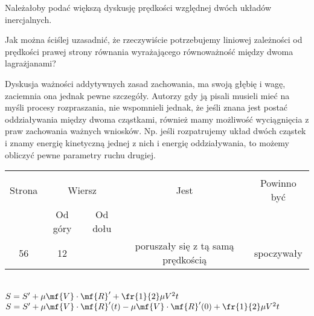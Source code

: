 \documentclass[a4paper,11pt]{article}
\begin{document}
\vspace{\spaceFour}


\start {} Należałoby podać większą dyskusję prędkości względnej
dwóch układów inercjalnych.

\vspace{\spaceFour}


\start {} Jak można ściślej uzasadnić, że rzeczywiście
potrzebujemy liniowej zależności od prędkości prawej strony równania
wyrażającego równoważność między dwoma lagrażjanami? \Dok

\vspace{\spaceFour}


\start {} Dyskusja ważności addytywnych zasad zachowania, ma
swoją głębię i wagę, zaciemnia ona jednak pewne szczegóły. Autorzy gdy
ją pisali musieli mieć na myśli procesy rozpraszania, nie wspomnieli
jednak, że jeśli znana jest postać oddziaływania między dwoma
cząstkami, również mamy możliwość wyciągnięcia z praw zachowania
ważnych wniosków. Np. jeśli rozpatrujemy układ dwóch cząstek i znamy
energię kinetyczną jednej z nich i energię oddziaływania, to możemy
obliczyć pewne parametry ruchu drugiej.


\begin{center}
  \begin{tabular}{|c|c|c|c|c|}
    \hline
    & \multicolumn{2}{c|}{} & & \\
    Strona & \multicolumn{2}{c|}{Wiersz} & Jest
                              & Powinno być \\ \cline{2-3}
    & Od góry & Od dołu & & \\
    \hline
    56  & 12 & & poruszały się z tą samą prędkością & spoczywały \\
    \hline
  \end{tabular}
\end{center}
\noi
{} \\
\Jest $S = S' + \mu \mf{V} \cdot \mf{R}' + \fr{ 1 }{ 2 } \mu V^{ 2 } t$ \\
\Pow $S = S' + \mu \mf{V} \cdot \mf{R}'( t ) - \mu \mf{V} \cdot
\mf{R}'( 0 ) + \fr{ 1 }{ 2 } \mu V^{ 2 } t$ \\

\vspace{\spaceTwo}





\end{document}
